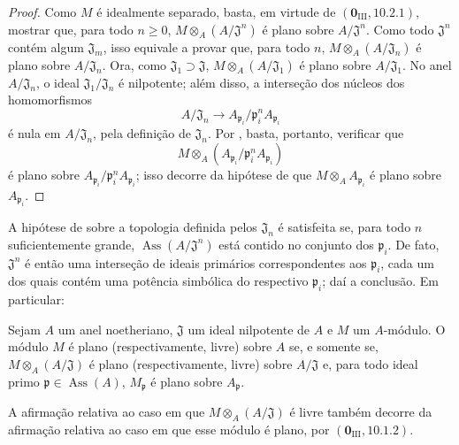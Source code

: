 \begin{proof}
Como $M$ é idealmente
separado, basta, em virtude
de
$(\mathbf 0_{\mathrm{III}},10.2.1)$,
mostrar que, para todo
$n\geq0$,
$M\otimes_A(A/\mathfrak J^n)$
é plano sobre
$A/\mathfrak J^n$.
Como todo $\mathfrak J^n$
contém algum $\mathfrak J_m$,
isso equivale a provar que,
para todo $n$,
$M\otimes_A(A/\mathfrak J_n)$
é plano sobre
$A/\mathfrak J_n$.
Ora, como
$\mathfrak J_1\supset
\mathfrak J$,
$M\otimes_A(A/\mathfrak J_1)$
é plano sobre
$A/\mathfrak J_1$.
No anel $A/\mathfrak J_n$,
o ideal
$\mathfrak J_1/\mathfrak J_n$
é nilpotente; além disso,
a interseção dos núcleos
dos homomorfismos
\[
A/\mathfrak J_n
\longrightarrow
A_{\mathfrak p_i}/
\mathfrak p_i^n
A_{\mathfrak p_i}
\]
é nula em
$A/\mathfrak J_n$, pela
definição de
$\mathfrak J_n$.
Por ,
basta, portanto, verificar
que
\[
M\otimes_A
(A_{\mathfrak p_i}/
\mathfrak p_i^n
A_{\mathfrak p_i})
\]
é plano sobre
$A_{\mathfrak p_i}/
\mathfrak p_i^n
A_{\mathfrak p_i}$;
isso decorre da hipótese
de que
$M\otimes_A A_{\mathfrak p_i}$
é plano sobre
$A_{\mathfrak p_i}$.
\end{proof}

\begin{remark}[11.4.8]
\label{IV.11.4.8}
A hipótese de
 sobre a
topologia definida pelos
$\mathfrak J_n$ é satisfeita
se, para todo $n$
suficientemente grande,
$\operatorname{Ass}
(A/\mathfrak J^n)$ está
contido no conjunto dos
$\mathfrak p_i$.
De fato, $\mathfrak J^n$
é então uma interseção de
ideais primários
correspondentes aos
$\mathfrak p_i$, cada um
dos quais contém uma
potência simbólica do
respectivo $\mathfrak p_i$;
daí a conclusão. Em
particular:
\end{remark}

\begin{corollary}[11.4.9]
\label{IV.11.4.9}
Sejam $A$ um anel
noetheriano, $\mathfrak J$
um ideal nilpotente de $A$
e $M$ um $A$-módulo.
O módulo $M$ é plano
(respectivamente, livre)
sobre $A$ se, e somente se,
$M\otimes_A(A/\mathfrak J)$
é plano (respectivamente,
livre) sobre $A/\mathfrak J$
e, para todo ideal primo
$\mathfrak p\in
\operatorname{Ass}(A)$,
$M_\mathfrak p$ é plano
sobre $A_\mathfrak p$.
\end{corollary}


A afirmação relativa ao caso
em que
$M\otimes_A(A/\mathfrak J)$
é livre também decorre da
afirmação relativa ao caso
em que esse módulo é plano,
por
$(\mathbf 0_{\mathrm{III}},10.1.2)$.


